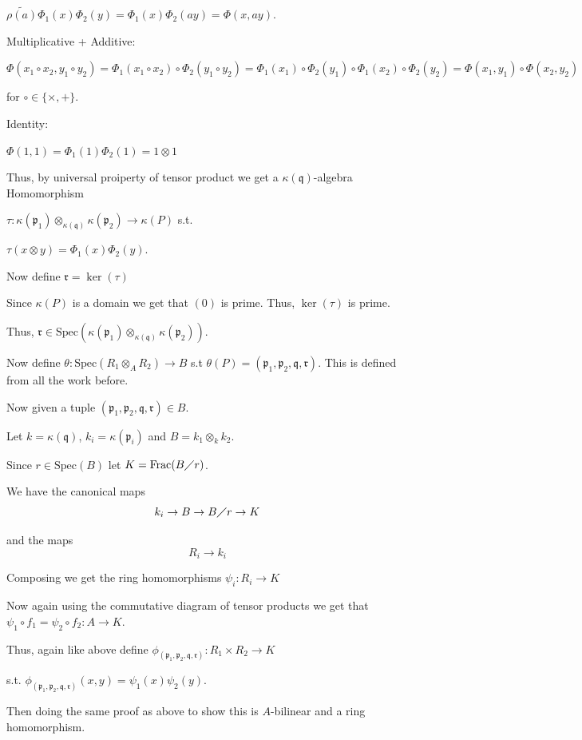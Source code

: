 \documentclass[12pt, letterpaper]{article}
\newcommand{\p}{\mathfrak{p}}
\newcommand{\Spec}{\mathrm{Spec}}
\newcommand{\mf}[1]{\mathfrak{#1}}
\begin{document}
\begin{problemproof}
    $\tilde{\rho(a)}\Phi_1(x)\Phi_2(y)=\Phi_1(x)\Phi_2(ay)=\Phi(x,ay)$.

    Multiplicative + Additive:

    $\Phi(x_1 \circ x_2, y_1 \circ y_2)=\Phi_1(x_1 \circ x_2) \circ \Phi_2(y_1 \circ y_2) = \Phi_1(x_1) \circ \Phi_2(y_1) \circ \Phi_1(x_2) \circ \Phi_2(y_2)=\Phi(x_1,y_1) \circ \Phi(x_2,y_2)$
    
    for $\circ \in \{\times, +\}$.

    Identity:

    $\Phi(1,1)=\Phi_1(1)\Phi_2(1)=1 \otimes 1$
    
    Thus, by universal proiperty of tensor product we get a $\kappa(\mf{q})$-algebra Homomorphism

    $\tau : \kappa(\p_1) \otimes_{\kappa(\mf{q})} \kappa(\p_2) \to \kappa(P)$ s.t.

    $\tau(x \otimes y) = \Phi_1(x)\Phi_2(y)$.

    Now define $\mf{r} = \ker(\tau)$

    Since $\kappa(P)$ is a domain we get that $(0)$ is prime. Thus, $\ker(\tau)$ is prime.

    Thus, $\mf{r} \in \Spec(\kappa(\p_1) \otimes_{\kappa(\mf{q})} \kappa(\p_2))$.

    Now define $\theta : \Spec(R_1 \otimes_A R_2) \to B$ s.t $\theta(P)=(\p_1,\p_2,\mf{q},\mf{r})$. This is defined from all the work before.

    Now given a tuple $(\p_1,\p_2,\mf{q},\mf{r}) \in B$.

    Let $k = \kappa(\mf{q})$, $k_i = \kappa(\p_i)$ and $B = k_1 \otimes_k k_2$.

    Since $r \in \Spec(B)$ let $K = \mathrm{Frac}(B \diagup r)$.

    We have the canonical maps
    \[k_i \to B \to B \diagup r \to K\]

    and the maps
    \[R_i \to k_i\]

    Composing we get the ring homomorphisms
    $\psi_i : R_i \to K$

    Now again using the commutative diagram of tensor products we get that
    $\psi_1 \circ f_1 = \psi_2 \circ f_2 : A \to K$.

    Thus, again like above define $\phi_{(\p_1,\p_2,\mf{q},\mf{r})} : R_1 \times R_2 \to K$

    s.t. $\phi_{(\p_1,\p_2,\mf{q},\mf{r})}(x,y)=\psi_1(x)\psi_2(y)$.

    Then doing the same proof as above to show this is $A$-bilinear and a ring homomorphism.


\end{problemproof}
\end{document}
